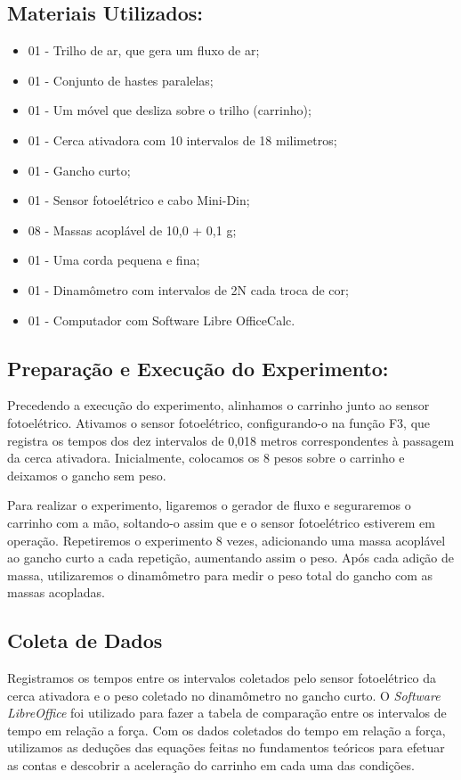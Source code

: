 \documentclass[article,11pt,oneside,a4paper,brazil]{abntex2}
\begin{document}
	\subsection{Materiais Utilizados:}
	\begin{adjustwidth}{1cm}{0cm}
		\begin{itemize}
			\item 01 - Trilho de ar, que gera um fluxo de ar;
			\item 01 - Conjunto de hastes paralelas;
			\item 01 - Um móvel que desliza sobre o trilho (carrinho);
			\item 01 - Cerca ativadora com 10 intervalos de 18 milimetros;
			\item 01 - Gancho curto;
			\item 01 - Sensor fotoelétrico e cabo Mini-Din;
			\item 08 - Massas acoplável de 10,0 + 0,1 g;
			\item 01 - Uma corda pequena e fina;
			\item 01 - Dinamômetro com intervalos de 2N cada troca de cor;	
			\item 01 - Computador com Software Libre OfficeCalc.
	\end{itemize}
	\end{adjustwidth}

	\subsection{Preparação e Execução do Experimento:}
	
	Precedendo a execução do experimento, alinhamos o carrinho junto ao sensor
	fotoelétrico. Ativamos o sensor fotoelétrico, configurando-o na função F3, que registra os tempos dos dez intervalos de 0,018 metros correspondentes à passagem da cerca ativadora. Inicialmente, colocamos os 8 pesos sobre o carrinho e deixamos o gancho sem peso.
	
	Para realizar o experimento, ligaremos o gerador de fluxo e seguraremos o carrinho com a mão, soltando-o assim que e o sensor fotoelétrico estiverem em operação. Repetiremos o experimento 8 vezes, adicionando uma massa acoplável ao gancho curto a cada repetição, aumentando assim o peso. Após cada adição de massa, utilizaremos o dinamômetro para medir o peso total do gancho com as massas acopladas.
		
	\subsection{Coleta de Dados}
	
	Registramos os tempos entre os intervalos coletados pelo sensor fotoelétrico da cerca ativadora e o peso coletado no dinamômetro no gancho curto. O \textit{Software LibreOffice} foi utilizado para fazer a tabela de comparação entre os intervalos de tempo em relação a força. Com os dados coletados do tempo em relação a força, utilizamos as deduções das equações feitas no fundamentos teóricos para efetuar as contas e descobrir a aceleração do carrinho em cada uma das condições.
\end{document}
